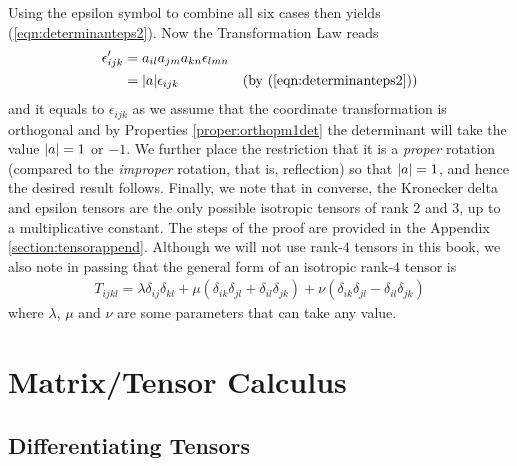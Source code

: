 Using the epsilon symbol to combine all six cases then yields (\ref{eqn:determinanteps2}). Now the Transformation Law reads
\begin{align*}
\epsilon'_{ijk} &= a_{il}a_{jm}a_{kn}\epsilon_{lmn} \\
&= \abs{a}\epsilon_{ijk} & \text{(by (\ref{eqn:determinanteps2}))}
\end{align*}
and it equals to $\epsilon_{ijk}$ as we assume that the coordinate transformation is orthogonal and by Properties \ref{proper:orthopm1det} the determinant will take the value $\abs{a} = 1$ or $-1$. We further place the restriction that it is a \textit{proper} rotation (compared to the \textit{improper} rotation, that is, reflection) so that $\abs{a} = 1$, and hence the desired result follows. Finally, we note that in converse, the Kronecker delta and epsilon tensors are the only possible isotropic tensors of rank $2$ and $3$, up to a multiplicative constant. The steps of the proof are provided in the Appendix \ref{section:tensorappend}. Although we will not use rank-$4$ tensors in this book, we also note in passing that the general form of an isotropic rank-$4$ tensor is
\begin{align}
T_{ijkl}= \lambda \delta_{ij}\delta_{kl} + \mu(\delta_{ik}\delta_{jl} + \delta_{il}\delta_{jk}) + \nu(\delta_{ik}\delta_{jl}-\delta_{il}\delta_{jk})
\end{align}
where $\lambda$, $\mu$ and $\nu$ are some parameters that can take any value.

\section{Matrix/Tensor Calculus}

\subsection{Differentiating Tensors}


